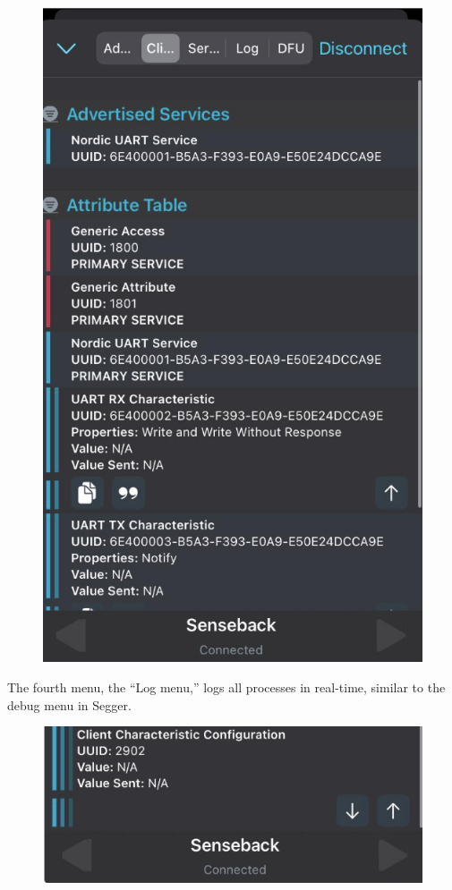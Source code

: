 \documentclass{Configuration_Files/PoliMi3i_thesis}
\begin{document}
\begin{figure}[H]
    \centering
    \includegraphics[scale=0.3]{Multicentral/11.png}
    \label{fig:nrf_connect_services}
\end{figure}

The fourth menu, the “Log menu,” logs all processes in real-time, similar to the debug menu in Segger.

\begin{figure}[H]
    \centering
    \includegraphics[scale=0.3]{Multicentral/12.png}
    \label{fig:nrf_connect_log}
\end{figure}
\end{document}
